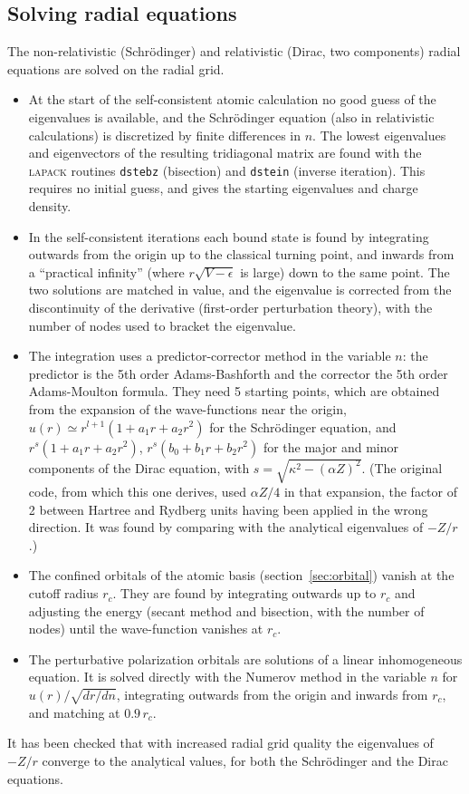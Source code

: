\documentclass[11pt]{article}
\begin{document}
\subsection{Solving radial equations}
\label{sec:solveq}

The non-relativistic (Schr\"odinger) and relativistic (Dirac, two components)
radial equations are solved on the radial grid.
\begin{itemize}
  \item
    At the start of the self-consistent atomic calculation no
    good guess of the eigenvalues is available, and the Schr\"odinger
    equation (also in relativistic calculations) is discretized by finite differences in $n$.
    The lowest eigenvalues and eigenvectors of the resulting tridiagonal matrix
    are found with the \textsc{lapack} routines \texttt{dstebz} (bisection) and
    \texttt{dstein} (inverse iteration).  This requires no initial guess, and gives the
    starting eigenvalues and charge density.
  \item
    In the self-consistent iterations each bound state is found by
    integrating outwards from the origin up to the classical turning point, and inwards
    from a ``practical infinity'' (where $r\sqrt{V-\epsilon}$ is large) down to the same point.
    The two solutions are matched in value, and the eigenvalue is corrected
    from the discontinuity of the derivative (first-order perturbation theory),
    with the number of nodes used to bracket the eigenvalue.
  \item
    The integration uses a predictor-corrector method in the variable $n$:
    the predictor is the 5th order Adams-Bashforth and the corrector
    the 5th order Adams-Moulton formula.  They need 5 starting points, which are
    obtained from the expansion of the wave-functions near the origin,
    $u(r) \simeq r^{l+1}(1 + a_1 r + a_2 r^2)$ for the Schr\"odinger equation, and
    $r^s(1 + a_1 r + a_2 r^2)$, $r^s(b_0 + b_1 r + b_2 r^2)$ for the major and minor components
    of the Dirac equation, with $s = \sqrt{\kappa^2 - (\alpha Z)^2}$.
    (The original code, from which this one derives, used $\alpha Z / 4$ in that expansion,
    the factor of 2 between Hartree and Rydberg units having been applied in the wrong direction.
    It was found by comparing with the analytical eigenvalues of $-Z/r$.)
  \item
    The confined orbitals of the atomic basis (section~\ref{sec:orbital}) vanish at the
    cutoff radius $r_c$.  They are found by integrating outwards up to $r_c$ and
    adjusting the energy (secant method and bisection, with the number of nodes)
    until the wave-function vanishes at $r_c$.
  \item
    The perturbative polarization orbitals are solutions of a linear inhomogeneous
    equation.  It is solved directly with the Numerov method in the variable $n$ for
    $u(r)/\sqrt{dr/dn}$, integrating outwards from the origin and inwards from $r_c$,
    and matching at $0.9\, r_c$.
\end{itemize}
It has been checked that with increased radial grid quality the eigenvalues of
$-Z/r$ converge to the analytical values, for both the Schr\"odinger and the Dirac equations.
\end{document}
